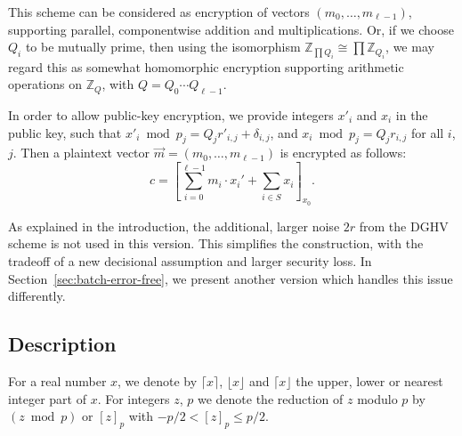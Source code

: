 \documentclass{llncs}
\renewcommand\leq\leqslant
\newcommand{\Z}{{\mathbb Z}}
\begin{document}
This scheme can be considered as encryption of vectors $(m_0, \dots, m_{\ell-1})$, supporting parallel, componentwise
addition and multiplications.  Or, if we choose $Q_i$ to be mutually prime, then using the isomorphism 
$\Z_{\prod Q_i}\cong\prod\Z_{Q_i}$, we may regard this as somewhat homomorphic encryption supporting arithmetic operations
on $\Z_Q$, with $Q=Q_0\cdots Q_{\ell-1}$.

In order to allow public-key encryption, we provide integers $x'_i$ and $x_i$ in the public key, such that $x'_i\bmod{p_j}=Q_{j}r'_{i,j}+\delta_{i,j}$, and $x_i\bmod{p_j}=Q_{j}r_{i,j}$ for all $i$, $j$.  Then a plaintext vector $\vec{m}=(m_0, \dots, m_{\ell-1})$ is encrypted as follows:
\[
c=\left[\sum_{i=0}^{\ell-1}m_i\cdot x_i'+\sum_{i\in S} x_i\right]_{x_0}.
\]

As explained in the introduction, the additional, larger noise $2r$ from the DGHV scheme is not used in this version.
This simplifies the construction, with the tradeoff of a new decisional assumption and larger security loss.  
In Section~\ref{sec:batch-error-free}, we present another version which handles this issue differently.

\subsection{Description}

For a real number
$x$, we denote by $\lceil x \rceil$, $\lfloor x \rfloor$ and $\lceil x
\rfloor$ the upper, lower or nearest integer part of $x$. For
integers $z$, $p$ we denote the reduction of $z$ modulo $p$ by
$(z\bmod p)$ or $[z]_p$ with $-p/2 < [z]_p \leq p/2$.
\end{document}

